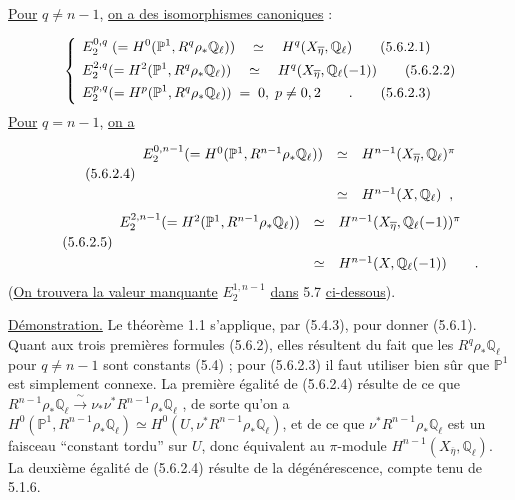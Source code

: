 \underline{Pour} $q \neq n-1$, \underline{on a des isomorphismes canoniques} :

\begin{align}
&E_2^{0,q} \; (=H^{0}(\mathbb{P}^1,R^q\rho_*\mathbb{Q}_\ell)) \quad \simeq \quad H^q(X_{\overline{\eta}},\mathbb{Q}_\ell) \tag{5.6.2.1}\\
\smash{\left\{\rule[-5ex]{0pt}{10ex}\right.}\;&E_2^{2,q}(=H^2(\mathbb{P}^1,R^q\rho_*\mathbb{Q}_\ell)) \quad \simeq \quad H^q(X_{\overline{\eta}},\mathbb{Q}_\ell(-1)) \tag{5.6.2.2}\\
&E_2^{p,q}(=H^p(\mathbb{P}^1,R^q\rho_*\mathbb{Q}_\ell)) \;=\; 0,\; p \neq 0,2 \qquad . \tag{5.6.2.3}
\end{align}
\underline{Pour} $q = n-1$, \underline{on a}

\begin{equation}\tag{5.6.2.4}
\begin{array}{r@{\quad \simeq \quad}l} E_2^{0,n-1}(=H^{0}(\mathbb{P}^1,R^{n-1}\rho_*\mathbb{Q}_\ell)) & H^{n-1}(X_{\overline{\eta}},\mathbb{Q}_\ell)^{\pi}\\[4ex]  & H^{n-1}(X,\mathbb{Q}_\ell) \;\;, \end{array}
\end{equation}
\begin{equation}\tag{5.6.2.5}
\begin{array}{r@{\quad \simeq \quad}l} E_2^{2,n-1}(=H^2(\mathbb{P}^1,R^{n-1}\rho_*\mathbb{Q}_\ell)) & H^{n-1}(X_{\overline{\eta}},\mathbb{Q}_\ell(-1))^{\pi}\\[4ex]  & H^{n-1}(X,\mathbb{Q}_\ell(-1)) \qquad . \end{array}
\end{equation}
(\underline{On trouvera la valeur manquante} $E_2^{1,n-1}$ \underline{dans} 5.7 \underline{ci-dessous}).

\underline{Démonstration.} Le théorème 1.1 s'applique, par (5.4.3), pour donner (5.6.1). Quant aux trois premières formules (5.6.2), elles résultent du fait que les $R^q\rho_*\mathbb{Q}_\ell$ pour $q \neq n-1$ sont constants (5.4) ; pour (5.6.2.3) il faut utiliser bien sûr que $\mathbb{P}^1$ est simplement connexe. La première
égalité de (5.6.2.4) résulte de ce que $R^{n-1}\rho_*\mathbb{Q}_{\ell} \xrightarrow{\ \sim\ } \nu_*\nu^*R^{n-1}\rho_*\mathbb{Q}_{\ell}$ , de sorte qu'on a $H^0(\mathbb{P}^1,R^{n-1}\rho_*\mathbb{Q}_{\ell}) \simeq H^0(U,\nu^*R^{n-1}\rho_*\mathbb{Q}_{\ell})$, et de ce que $\nu^*R^{n-1}\rho_*\mathbb{Q}_{\ell}$ est un faisceau ``constant tordu'' sur $U$, donc équivalent au $\pi$-module $H^{n-1}(X_{\overline{\eta}},\mathbb{Q}_{\ell})$. La deuxième égalité de (5.6.2.4) résulte de la dégénérescence, compte tenu de 5.1.6.

